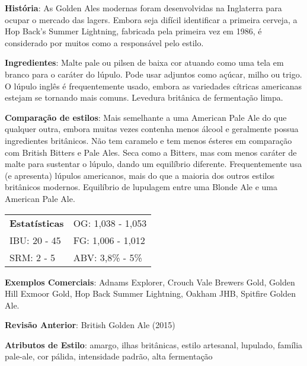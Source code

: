 \textbf{História}: As Golden Ales modernas foram desenvolvidas na Inglaterra para ocupar o mercado das lagers. Embora seja difícil identificar a primeira cerveja, a Hop Back's Summer Lightning, fabricada pela primeira vez em 1986, é considerado por muitos como a responsável pelo estilo.

\textbf{Ingredientes}: Malte pale ou pilsen de baixa cor atuando como uma tela em branco para o caráter do lúpulo. Pode usar adjuntos como açúcar, milho ou trigo. O lúpulo inglês é frequentemente usado, embora as variedades cítricas americanas estejam se tornando mais comuns. Levedura britânica de fermentação limpa.

\textbf{Comparação de estilos}: Mais semelhante a uma American Pale Ale do que qualquer outra, embora muitas vezes contenha menos álcool e geralmente possua ingredientes britânicos. Não tem caramelo e tem menos ésteres em comparação com British Bitters e Pale Ales. Seca como a Bitters, mas com menos caráter de malte para sustentar o lúpulo, dando um equilíbrio diferente. Frequentemente usa (e apresenta) lúpulos americanos, mais do que a maioria dos outros estilos britânicos modernos. Equilíbrio de lupulagem entre uma Blonde Ale e uma American Pale Ale.

\begin{tabular}{@{}p{35mm}p{35mm}@{}}
  \textbf{Estatísticas} & OG: 1,038 - 1,053 \\
  IBU: 20 - 45  & FG: 1,006 - 1,012  \\
  SRM: 2 - 5  & ABV: 3,8\% - 5\%
\end{tabular}

\textbf{Exemplos Comerciais}: Adnams Explorer, Crouch Vale Brewers Gold, Golden Hill Exmoor Gold, Hop Back Summer Lightning, Oakham JHB, Spitfire Golden Ale.

\textbf{Revisão Anterior}: British Golden Ale (2015)

\textbf{Atributos de Estilo}: amargo, ilhas britânicas, estilo artesanal, lupulado, família pale-ale, cor pálida, intensidade padrão, alta fermentação
